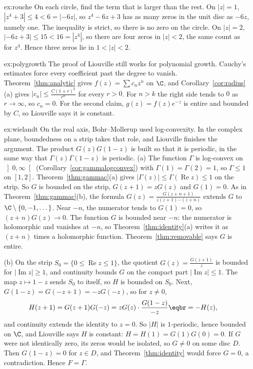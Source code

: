 \begin{solution}{ex:rouche}
\idea On each circle, find the term that is larger than the rest.
\writeup On $|z|=1$, $|z^4+3|\le4<6=|-6z|$, so $z^4-6z+3$ has as many zeros in the unit disc as $-6z$, namely one. The inequality is strict, so there is no zero on the circle. On $|z|=2$, $|-6z+3|\le15<16=|z^4|$, so there are four zeros in $|z|<2$, the same count as for $z^4$. Hence three zeros lie in $1<|z|<2$.
\end{solution}

\begin{solution}{ex:polygrowth}
\idea The proof of Liouville still works for polynomial growth. Cauchy's estimates force every coefficient past the degree to vanish.
\writeup Theorem~\ref{thm:analytic} gives $f(z)=\sum c_nz^n$ on $\C$, and Corollary~\ref{cor:radius}(a) gives $|c_n|\le\frac{C(1+r)^k}{r^n}$ for every $r>0$. For $n>k$ the right side tends to $0$ as $r\to\infty$, so $c_n=0$. For the second claim, $g(z)=f(z)e^{-z}$ is entire and bounded by $C$, so Liouville says it is constant.
\end{solution}

\begin{solution}{ex:wielandt}
\idea On the real axis, Bohr--Mollerup used log-convexity. In the complex plane, boundedness on a strip takes that role, and Liouville finishes the argument. The product $G(z)G(1-z)$ is built so that it is periodic, in the same way that $\Gamma(z)\Gamma(1-z)$ is periodic.
\writeup (a) The function $\Gamma$ is log-convex on $\left]0,\infty\right[$ (Corollary~\ref{cor:gammalogconvex}) with $\Gamma(1)=\Gamma(2)=1$, so $\Gamma\le1$ on $[1,2]$. Theorem~\ref{thm:gammac}(a) gives $|\Gamma(z)|\le\Gamma(\operatorname{Re}z)\le1$ on the strip. So $G$ is bounded on the strip, $G(z+1)=zG(z)$ and $G(1)=0$. As in Theorem~\ref{thm:gammac}(b), the formula $G(z)=\frac{G(z+n+1)}{z(z+1)\cdots(z+n)}$ extends $G$ to $\C\setminus\{0,-1,\dots\}$. Near $-n$, the numerator tends to $G(1)=0$, so $(z+n)G(z)\to0$. The function $G$ is bounded near $-n$: the numerator is holomorphic and vanishes at $-n$, so Theorem~\ref{thm:identity}(a) writes it as $(z+n)$ times a holomorphic function. Theorem~\ref{thm:removable} says $G$ is entire.

(b) On the strip $S_0=\{0\le\operatorname{Re}z\le1\}$, the quotient $G(z)=\frac{G(z+1)}z$ is bounded for $|\operatorname{Im}z|\ge1$, and continuity bounds $G$ on the compact part $|\operatorname{Im}z|\le1$. The map $z\mapsto1-z$ sends $S_0$ to itself, so $H$ is bounded on $S_0$. Next, $G(1-z)=G(-z+1)=-zG(-z)$, so for $z\ne0$,
\[
\begin{aligned}H(z+1)&=G(z+1)G(-z)=zG(z)\cdot\frac{G(1-z)}{-z}\eqbr=-H(z),\end{aligned}
\]
and continuity extends the identity to $z=0$. So $|H|$ is $1$-periodic, hence bounded on $\C$, and Liouville says $H$ is constant: $H=H(1)=G(1)G(0)=0$. If $G$ were not identically zero, its zeros would be isolated, so $G\ne0$ on some disc $D$. Then $G(1-z)=0$ for $z\in D$, and Theorem~\ref{thm:identity} would force $G=0$, a contradiction. Hence $F=\Gamma$.
\end{solution}

